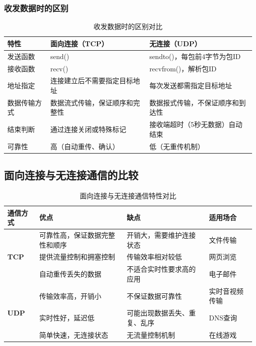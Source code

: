 \documentclass[a4paper]{article}
\begin{document}
\subsubsection{收发数据时的区别}

\begin{table}[H]
    \centering
    \caption{收发数据时的区别对比}
    \begin{tabular}{@{}p{}p{}p{}@{}}
        \toprule
        \textbf{特性} & \textbf{面向连接（TCP）} & \textbf{无连接（UDP）} \\
        \midrule
        发送函数 & send() & sendto()，每包前4字节为包ID \\
        \midrule
        接收函数 & recv() & recvfrom()，解析包ID \\
        \midrule
        地址指定 & 连接建立后不需要指定目标地址 & 每次发送都需指定目标地址 \\
        \midrule
        数据传输方式 & 数据流式传输，保证顺序和完整性 & 数据报式传输，不保证顺序和到达性 \\
        \midrule
        结束判断 & 通过连接关闭或特殊标记 & 接收端超时（5秒无数据）自动结束 \\
        \midrule
        可靠性 & 高（自动重传、确认） & 低（无重传机制） \\
        \bottomrule
    \end{tabular}
\end{table}

\subsection{面向连接与无连接通信的比较}

\begin{table}[H]
    \centering
    \caption{面向连接与无连接通信特性对比}
    \begin{tabular}{@{}p{}p{}p{}p{}@{}}
        \toprule
        \textbf{通信方式} & \textbf{优点} & \textbf{缺点} & \textbf{适用场合} \\
        \midrule
        \multirow{3}{*}{\textbf{TCP}} & 可靠性高，保证数据完整性和顺序 & 开销大，需要维护连接状态 & 文件传输 \\
        & 提供流量控制和拥塞控制 & 传输效率相对较低 & 网页浏览 \\
        & 自动重传丢失的数据 & 不适合实时性要求高的应用 & 电子邮件 \\
        \midrule
        \multirow{3}{*}{\textbf{UDP}} & 传输效率高，开销小 & 不保证数据可靠性 & 实时音视频传输 \\
        & 实时性好，延迟低 & 可能出现数据丢失、重复、乱序 & DNS查询 \\
        & 简单快速，无连接状态 & 无流量控制机制 & 在线游戏 \\
        \bottomrule
    \end{tabular}
\end{table}
\end{document}
